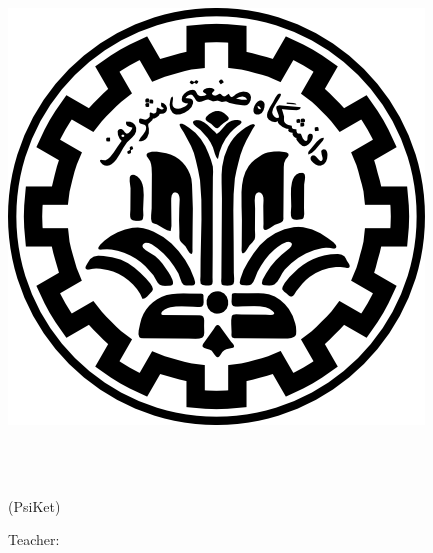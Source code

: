 
\pagestyle{empty}

\begin{center}

\begin{latin}

\includegraphics[scale=0.2]{front/template/images/logo.png}

\EnglishThesisUniversity \\[0.7em]

\begin{large}
\vspace{0.7cm}
\EnglishThesisType \\[-0.3em]
(PsiKet)


\vspace{3cm}

{\Large\textbf\EnglishThesisTitle}

\vspace{1.5cm}

\vspace{3cm}

{\normalsize Teacher:}\\ 
\textbf{\EnglishThesisSupervisor}

\end{large}

\vspace{1.5cm}
\EnglishThesisDate

\end{latin}

\end{center}
